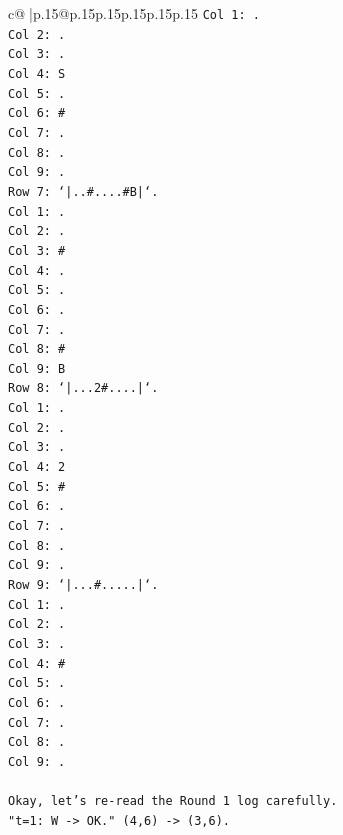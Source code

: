 \documentclass{article}
\begin{document}
{\begin{supertabular}{c@{$\;$}|p{.15\linewidth}@{}p{.15\linewidth}p{.15\linewidth}p{.15\linewidth}p{.15\linewidth}p{.15\linewidth}}
{{{\texttt{Col 1: .} \\
\texttt{Col 2: .} \\
\texttt{Col 3: .} \\
\texttt{Col 4: S} \\
\texttt{Col 5: .} \\
\texttt{Col 6: \#} \\
\texttt{Col 7: .} \\
\texttt{Col 8: .} \\
\texttt{Col 9: .} \\
\texttt{Row 7: `|..\#....\#B|`.} \\
\texttt{Col 1: .} \\
\texttt{Col 2: .} \\
\texttt{Col 3: \#} \\
\texttt{Col 4: .} \\
\texttt{Col 5: .} \\
\texttt{Col 6: .} \\
\texttt{Col 7: .} \\
\texttt{Col 8: \#} \\
\texttt{Col 9: B} \\
\texttt{Row 8: `|...2\#....|`.} \\
\texttt{Col 1: .} \\
\texttt{Col 2: .} \\
\texttt{Col 3: .} \\
\texttt{Col 4: 2} \\
\texttt{Col 5: \#} \\
\texttt{Col 6: .} \\
\texttt{Col 7: .} \\
\texttt{Col 8: .} \\
\texttt{Col 9: .} \\
\texttt{Row 9: `|...\#.....|`.} \\
\texttt{Col 1: .} \\
\texttt{Col 2: .} \\
\texttt{Col 3: .} \\
\texttt{Col 4: \#} \\
\texttt{Col 5: .} \\
\texttt{Col 6: .} \\
\texttt{Col 7: .} \\
\texttt{Col 8: .} \\
\texttt{Col 9: .} \\
\\ 
\texttt{Okay, let's re{-}read the Round 1 log carefully.} \\
\texttt{"t=1: W {-}> OK." (4,6) {-}> (3,6).} \\
}}}
\end{supertabular}}
\end{document}
